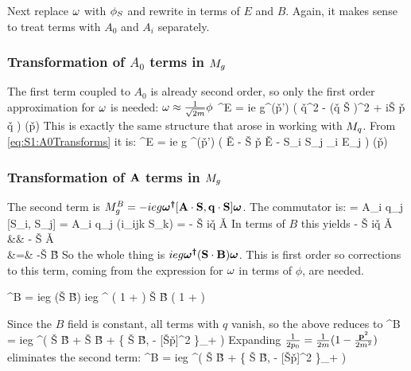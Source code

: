 Next replace $\omega$ with $\phi_S$ and rewrite in terms of $E$ and $B$.  Again, it makes sense to treat terms with $A_0$ and $A_i$ separately. 
\subsubsection{Transformation of $A_0$ terms in $M_g$}
The first term coupled to $A_0$ is already second order, so only the first order approximation for $\omega$ is needed: $\mathbf{\omega} \approx \frac{1}{\sqrt{2m}}\phi$
\beq
	\Mg^E = ie g\phi^\dagger(\v{p'})    \left( \v{q}^2 - (\v{q} \cdot \v{S} )^2 + i\v{S} \cdot \v{p} \times \v{q} \right) \phi (\v{p})
\eeq
This is exactly the same structure that arose in working with $M_q$.  From \eqref{eq:S1:A0Transforms} it is:
\beq
\Mg^E = 
 ie g \phi^\dagger(\v{p'})  ( \grad \cdot \v{E} -  \v{S} \cdot \v{p} \times \v{E} - S_i S_j \grad_i E_j ) \phi (\v{p})
\eeq

\subsubsection{Transformation of $\mathbf{A}$ terms in $M_g$}
The second term  is  $M_g^B = -ie g\mbox{\boldmath$ \omega^\dagger $} [\mathbf{A} \cdot \mathbf{S}, \mathbf{q} \cdot \mathbf{S}] \mbox{\boldmath$ \omega $}$.  The commutator is:
	=	A_i q_j [S_i, S_j]	
	=	A_i q_j (i\epsilon_{ijk} S_k)	
	=	- \v{S} \cdot i\v{q} \times \v{A}	
\eeq
In terms of $B$ this yields
\beqa
- \v{S} \cdot i\v{q} \times \v{A}
	&\to&	- \v{S} \cdot \grad \times \v{A} 	\\
	&=&	-\v{S} \cdot \v{B}	
\eeqa
So the whole thing is $ieg \mbox{\boldmath$ \omega^\dagger $} (\mathbf{S} \cdot \mathbf{B}) \mbox{\boldmath$ \omega $}$.  This is first order so corrections to this term, coming from the expression for $\omega$ in terms of $\phi$, are needed.

\beq
 \Mg^B = ieg\gv{\W^\dagger} (\v{S} \cdot \v{B}) \gv{\W} \to
	ieg  \phi^\dagger
		\left( 1 +  \right) 
		\v{S} \cdot \v{B}
		\left( 1 +  \right)
	\phi
\eeq


Since the $B$ field is constant, all terms with $q$ vanish, so the above reduces to
\beq
\Mg^B	=  ieg  \phi^\dagger	\left(  
		\v{S} \cdot \v{B} +  \v{S} \cdot \v{B}  + \left\{ \v{S} \cdot \v{B},  - [\v{S}\cdot \v{p}]^2 \right\}_+	\right ) \phi
\eeq
Expanding $\frac{1}{2p_0} = \frac{1}{2m}(1 - \frac{\mathbf{p}^2}{2m^2} )$ eliminates the second term:
\beq
	\Mg^B =  ieg  \phi^\dagger	\left(  
		\v{S} \cdot \v{B}  + \left\{ \v{S} \cdot \v{B},  - [\v{S}\cdot \v{p}]^2 \right\}_+	\right ) \phi
\eeq




